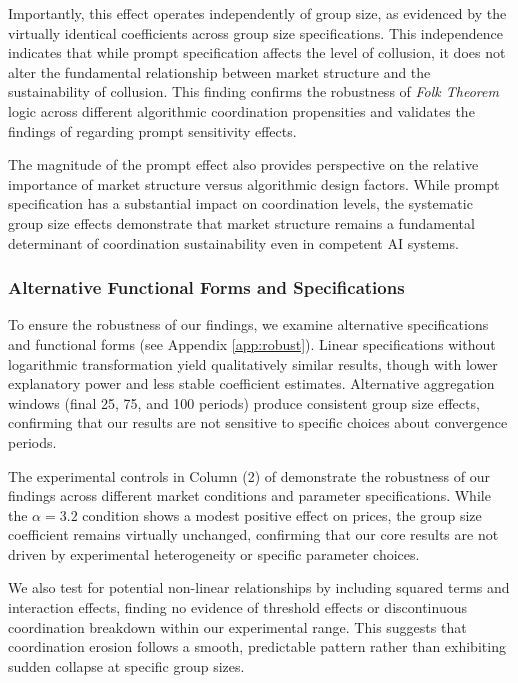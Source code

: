 Importantly, this effect operates independently of group size, as evidenced by the virtually identical coefficients across group size specifications. This independence indicates that while prompt specification affects the level of collusion, it does not alter the fundamental relationship between market structure and the sustainability of collusion. This finding confirms the robustness of \emph{Folk Theorem} logic across different algorithmic coordination propensities and validates the findings of \textcite{fish_algorithmic_2025} regarding prompt sensitivity effects.

The magnitude of the prompt effect also provides perspective on the relative importance of market structure versus algorithmic design factors. While prompt specification has a substantial impact on coordination levels, the systematic group size effects demonstrate that market structure remains a fundamental determinant of coordination sustainability even in competent AI systems.

\subsubsection*{Alternative Functional Forms and Specifications}

To ensure the robustness of our findings, we examine alternative specifications and functional forms (see Appendix \ref{app:robust}). Linear specifications without logarithmic transformation yield qualitatively similar results, though with lower explanatory power and less stable coefficient estimates. Alternative aggregation windows (final 25, 75, and 100 periods) produce consistent group size effects, confirming that our results are not sensitive to specific choices about convergence periods.

The experimental controls in Column (2) of  demonstrate the robustness of our findings across different market conditions and parameter specifications. While the $\alpha = 3.2$ condition shows a modest positive effect on prices, the group size coefficient remains virtually unchanged, confirming that our core results are not driven by experimental heterogeneity or specific parameter choices.

We also test for potential non-linear relationships by including squared terms and interaction effects, finding no evidence of threshold effects or discontinuous coordination breakdown within our experimental range. This suggests that coordination erosion follows a smooth, predictable pattern rather than exhibiting sudden collapse at specific group sizes.

